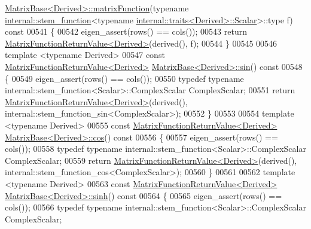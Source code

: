 \begin{DoxyCode}
      \hyperlink{group___core___module_class_eigen_1_1_matrix_base}{MatrixBase<Derived>::matrixFunction}(\textcolor{keyword}{typename} 
      \hyperlink{struct_eigen_1_1internal_1_1stem__function}{internal::stem\_function}<\textcolor{keyword}{typename} 
      \hyperlink{struct_eigen_1_1internal_1_1traits}{internal::traits<Derived>::Scalar}>::type f)\textcolor{keyword}{ const}
00541 \textcolor{keyword}{}\{
00542   eigen\_assert(rows() == cols());
00543   \textcolor{keywordflow}{return} \hyperlink{class_eigen_1_1_matrix_function_return_value}{MatrixFunctionReturnValue<Derived>}(derived(), f);
00544 \}
00545 
00546 \textcolor{keyword}{template} <\textcolor{keyword}{typename} Derived>
00547 \textcolor{keyword}{const} \hyperlink{class_eigen_1_1_matrix_function_return_value}{MatrixFunctionReturnValue<Derived>} 
      \hyperlink{group___core___module_class_eigen_1_1_matrix_base}{MatrixBase<Derived>::sin}()\textcolor{keyword}{ const}
00548 \textcolor{keyword}{}\{
00549   eigen\_assert(rows() == cols());
00550   \textcolor{keyword}{typedef} \textcolor{keyword}{typename} internal::stem\_function<Scalar>::ComplexScalar ComplexScalar;
00551   \textcolor{keywordflow}{return} \hyperlink{class_eigen_1_1_matrix_function_return_value}{MatrixFunctionReturnValue<Derived>}(derived(), 
      internal::stem\_function\_sin<ComplexScalar>);
00552 \}
00553 
00554 \textcolor{keyword}{template} <\textcolor{keyword}{typename} Derived>
00555 \textcolor{keyword}{const} \hyperlink{class_eigen_1_1_matrix_function_return_value}{MatrixFunctionReturnValue<Derived>} 
      \hyperlink{group___core___module_class_eigen_1_1_matrix_base}{MatrixBase<Derived>::cos}()\textcolor{keyword}{ const}
00556 \textcolor{keyword}{}\{
00557   eigen\_assert(rows() == cols());
00558   \textcolor{keyword}{typedef} \textcolor{keyword}{typename} internal::stem\_function<Scalar>::ComplexScalar ComplexScalar;
00559   \textcolor{keywordflow}{return} \hyperlink{class_eigen_1_1_matrix_function_return_value}{MatrixFunctionReturnValue<Derived>}(derived(), 
      internal::stem\_function\_cos<ComplexScalar>);
00560 \}
00561 
00562 \textcolor{keyword}{template} <\textcolor{keyword}{typename} Derived>
00563 \textcolor{keyword}{const} \hyperlink{class_eigen_1_1_matrix_function_return_value}{MatrixFunctionReturnValue<Derived>} 
      \hyperlink{group___core___module_class_eigen_1_1_matrix_base}{MatrixBase<Derived>::sinh}()\textcolor{keyword}{ const}
00564 \textcolor{keyword}{}\{
00565   eigen\_assert(rows() == cols());
00566   \textcolor{keyword}{typedef} \textcolor{keyword}{typename} internal::stem\_function<Scalar>::ComplexScalar ComplexScalar;

\end{DoxyCode}
